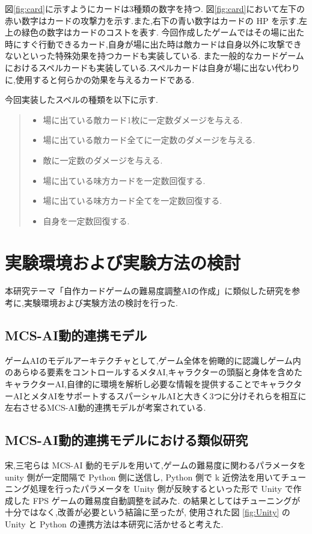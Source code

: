 \documentclass{jarticle}     %
\begin{document}
図\ref{fig:card}に示すようにカードは3種類の数字を持つ.
図\ref{fig:card}において左下の赤い数字はカードの攻撃力を示す.また,右下の青い数字はカードの HP を示す.左上の緑色の数字はカードのコストを表す.
今回作成したゲームではその場に出た時にすぐ行動できるカード,自身が場に出た時は敵カードは自身以外に攻撃できないといった特殊効果を持つカードも実装している.
また一般的なカードゲームにおけるスペルカードも実装している.スペルカードは自身が場に出ない代わりに,使用すると何らかの効果を与えるカードである.
\par
\par
\par
今回実装したスペルの種類を以下に示す.
\begin{quote}
  \begin{itemize}
   \item 場に出ている敵カード1枚に一定数ダメージを与える.
   \item 場に出ている敵カード全てに一定数のダメージを与える.
   \item 敵に一定数のダメージを与える.
   \item 場に出ている味方カードを一定数回復する.
   \item 場に出ている味方カード全てを一定数回復する.
   \item 自身を一定数回復する.
  \end{itemize}
 \end{quote}



\section{実験環境および実験方法の検討}
本研究テーマ「自作カードゲームの難易度調整AIの作成」に類似した研究を参考に,実験環境および実験方法の検討を行った.

\subsection{MCS-AI動的連携モデル}
ゲームAIのモデルアーキテクチャとして,ゲーム全体を俯瞰的に認識しゲーム内のあらゆる要素をコントロールするメタAI,キャラクターの頭脳と身体を含めたキャラクターAI,自律的に環境を解析し必要な情報を提供することでキャラクターAIとメタAIをサポートするスパーシャルAIと大きく3つに分けそれらを相互に左右させるMCS-AI動的連携モデルが考案されている\cite{MCSAIモデル}.


\subsection{MCS-AI動的連携モデルにおける類似研究}
宋,三宅らは MCS-AI 動的モデルを用いて,ゲームの難易度に関わるパラメータを unity 側が一定間隔で Python 側に送信し, Python 側で k 近傍法を用いてチューニング処理を行ったパラメータを Unity 側が反映するといった形で Unity で作成した FPS ゲームの難易度自動調整を試みた\cite{FPS}. \cite{FPS}の結果としてはチューニングが十分ではなく,改善が必要という結論に至ったが, 使用された図 \ref{fig:Unity} のUnity と Python の連携方法は本研究に活かせると考えた.
\end{document}
